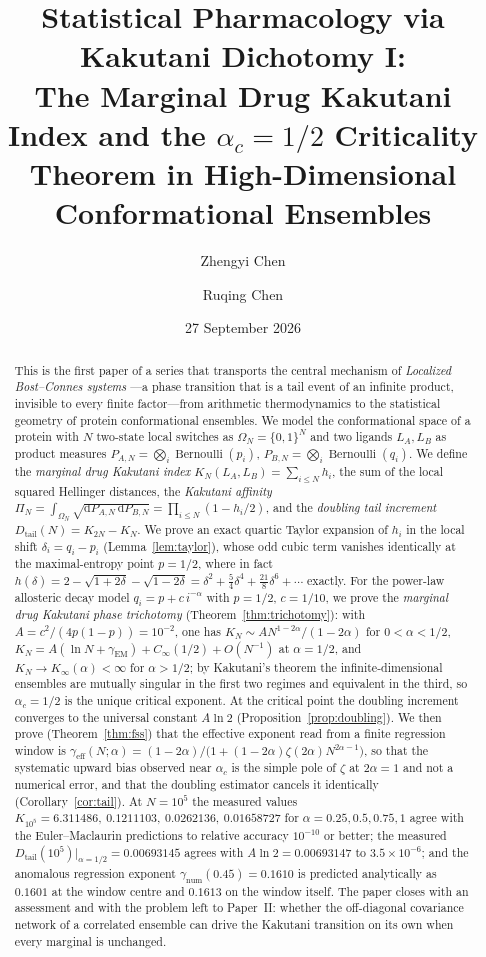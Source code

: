 \documentclass[11pt,reqno]{amsart}
\title[Statistical pharmacology via Kakutani dichotomy I]{Statistical Pharmacology via Kakutani Dichotomy I:\\ The Marginal Drug Kakutani Index and the $\alpha_c=1/2$ Criticality Theorem in High-Dimensional Conformational Ensembles}
\author[Z. Chen]{Zhengyi Chen}
\author[R. Chen]{Ruqing Chen}
\date{27 September 2026}
\theoremstyle{plain}
\theoremstyle{definition}
\theoremstyle{remark}
\numberwithin{equation}{section}
\DeclareMathOperator{\Bern}{Bernoulli}
\newcommand{\dd}{\mathrm{d}}
\newcommand{\Dtail}{D_{\mathrm{tail}}}
\newcommand{\gnum}{\gamma_{\mathrm{num}}}
\newcommand{\geff}{\gamma_{\mathrm{eff}}}
\newcommand{\LA}{L_A}
\newcommand{\LB}{L_B}
\newcommand{\PAN}{P_{A,N}}
\newcommand{\PBN}{P_{B,N}}
\begin{document}
\begin{abstract}
This is the first paper of a series that transports the central mechanism of \emph{Localized Bost--Connes systems} \cite{Chen2026}---a phase transition that is a tail event of an infinite product, invisible to every finite factor---from arithmetic thermodynamics to the statistical geometry of protein conformational ensembles. We model the conformational space of a protein with $N$ two-state local switches as $\Omega_N=\{0,1\}^N$ and two ligands $\LA,\LB$ as product measures $\PAN=\bigotimes_i\Bern(p_i)$, $\PBN=\bigotimes_i\Bern(q_i)$. We define the \emph{marginal drug Kakutani index} $K_N(\LA,\LB)=\sum_{i\le N}h_i$, the sum of the local squared Hellinger distances, the \emph{Kakutani affinity} $\Pi_N=\int_{\Omega_N}\sqrt{\dd\PAN\,\dd\PBN}=\prod_{i\le N}(1-h_i/2)$, and the \emph{doubling tail increment} $\Dtail(N)=K_{2N}-K_N$. We prove an exact quartic Taylor expansion of $h_i$ in the local shift $\delta_i=q_i-p_i$ (Lemma~\ref{lem:taylor}), whose odd cubic term vanishes identically at the maximal-entropy point $p=1/2$, where in fact $h(\delta)=2-\sqrt{1+2\delta}-\sqrt{1-2\delta}=\delta^2+\tfrac54\delta^4+\tfrac{21}{8}\delta^6+\cdots$ exactly. For the power-law allosteric decay model $q_i=p+c\,i^{-\alpha}$ with $p=1/2$, $c=1/10$, we prove the \emph{marginal drug Kakutani phase trichotomy} (Theorem~\ref{thm:trichotomy}): with $A=c^2/(4p(1-p))=10^{-2}$, one has $K_N\sim A N^{1-2\alpha}/(1-2\alpha)$ for $0<\alpha<1/2$, $K_N=A(\ln N+\gamma_{\mathrm{EM}})+C_\infty(1/2)+O(N^{-1})$ at $\alpha=1/2$, and $K_N\to K_\infty(\alpha)<\infty$ for $\alpha>1/2$; by Kakutani's theorem the infinite-dimensional ensembles are mutually singular in the first two regimes and equivalent in the third, so $\alpha_c=1/2$ is the unique critical exponent. At the critical point the doubling increment converges to the universal constant $A\ln2$ (Proposition~\ref{prop:doubling}). We then prove (Theorem~\ref{thm:fss}) that the effective exponent read from a finite regression window is $\geff(N;\alpha)=(1-2\alpha)/\bigl(1+(1-2\alpha)\zeta(2\alpha)N^{2\alpha-1}\bigr)$, so that the systematic upward bias observed near $\alpha_c$ is the simple pole of $\zeta$ at $2\alpha=1$ and not a numerical error, and that the doubling estimator cancels it identically (Corollary~\ref{cor:tail}). At $N=10^5$ the measured values $K_{10^5}=6.311486,\ 0.1211103,\ 0.0262136,\ 0.01658727$ for $\alpha=0.25,0.5,0.75,1$ agree with the Euler--Maclaurin predictions to relative accuracy $10^{-10}$ or better; the measured $\Dtail(10^5)|_{\alpha=1/2}=0.00693145$ agrees with $A\ln 2=0.00693147$ to $3.5\times10^{-6}$; and the anomalous regression exponent $\gnum(0.45)=0.1610$ is predicted analytically as $0.1601$ at the window centre and $0.1613$ on the window itself. The paper closes with an assessment and with the problem left to Paper~II: whether the off-diagonal covariance network of a correlated ensemble can drive the Kakutani transition on its own when every marginal is unchanged.
\end{abstract}
\end{document}
